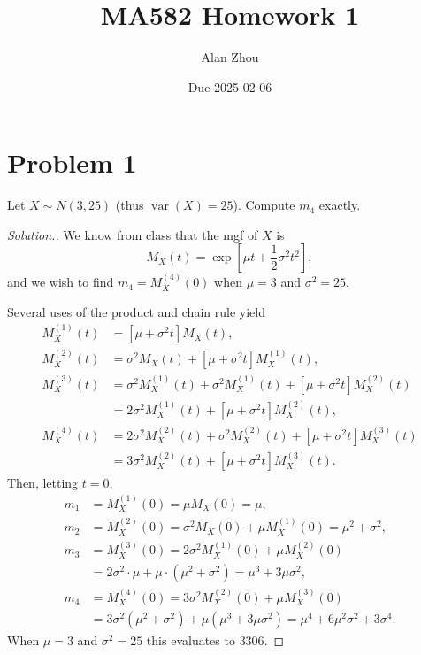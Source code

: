 \documentclass{article}
\title{MA582 Homework 1}
\author{Alan Zhou}
\date{Due 2025-02-06}
\begin{document}
\maketitle


\section*{Problem 1}
Let $X\sim N(3,25)$ (thus $\operatorname{var}(X) = 25$). Compute $m_4$ exactly.

\begin{proof}[Solution.] 
We know from class that the mgf of $X$ is
\begin{equation*}
M_X(t) = \exp\left[\mu t + \frac{1}{2}\sigma^2t^2\right],
\end{equation*}
and we wish to find $m_4 = M_X^{(4)}(0)$ when $\mu = 3$ and $\sigma^2 = 25$.\par 
Several uses of the product and chain rule yield
\begin{align*}
M_X^{(1)}(t) &= [\mu + \sigma^2 t]M_X(t), \\
M_X^{(2)}(t) &= \sigma^2 M_X(t) + [\mu + \sigma^2 t]M_X^{(1)}(t), \\
M_X^{(3)}(t) &= \sigma^2 M_X^{(1)}(t) + \sigma^2 M_X^{(1)}(t) + [\mu + \sigma^2 t]M_X^{(2)}(t) \\
&= 2\sigma^2 M_X^{(1)}(t) + [\mu + \sigma^2 t]M_X^{(2)}(t), \\
M_X^{(4)}(t) &= 2\sigma^2 M_X^{(2)}(t) + \sigma^2 M_X^{(2)}(t) + [\mu + \sigma^2 t]M_X^{(3)}(t) \\
&= 3\sigma^2 M_X^{(2)}(t) + [\mu + \sigma^2 t]M_X^{(3)}(t).
\end{align*}
Then, letting $t = 0$,
\begin{align*}
m_1 &= M_X^{(1)}(0) = \mu M_X(0) = \mu, \\
m_2 &= M_X^{(2)}(0) = \sigma^2 M_X(0) + \mu M_X^{(1)}(0) = \mu^2 + \sigma^2, \\
m_3 &= M_X^{(3)}(0) = 2\sigma^2 M_X^{(1)}(0) + \mu M_X^{(2)}(0) \\
&= 2\sigma^2\cdot\mu + \mu\cdot (\mu^2 + \sigma^2) = \mu^3 + 3\mu\sigma^2, \\
m_4 &= M_X^{(4)}(0) = 3\sigma^2 M_X^{(2)}(0) + \mu M_X^{(3)}(0) \\
&= 3\sigma^2(\mu^2 + \sigma^2) + \mu(\mu^3 + 3\mu\sigma^2) = \mu^4 + 6\mu^2\sigma^2 + 3\sigma^4.
\end{align*}
When $\mu = 3$ and $\sigma^2 = 25$ this evaluates to $\boxed{3306}$.
\end{proof}
\end{document}

